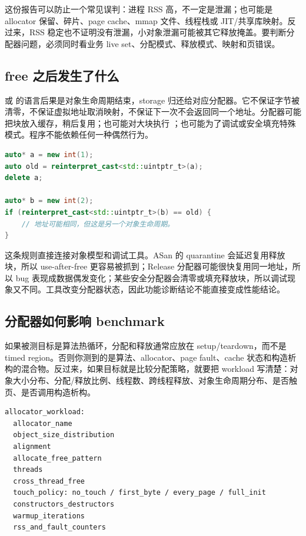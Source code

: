 这份报告可以防止一个常见误判：进程 RSS 高，不一定是泄漏；也可能是 allocator 保留、碎片、page cache、mmap 文件、线程栈或 JIT/共享库映射。反过来，RSS 稳定也不证明没有泄漏，小对象泄漏可能被其它释放掩盖。要判断分配器问题，必须同时看业务 live set、分配模式、释放模式、映射和页错误。

\subsection{free 之后发生了什么}

 或  的语言后果是对象生命周期结束，storage 归还给对应分配器。它不保证字节被清零，不保证虚拟地址取消映射，不保证下一次不会返回同一个地址。分配器可能把块放入缓存，稍后复用；也可能对大块执行 ；也可能为了调试或安全填充特殊模式。程序不能依赖任何一种偶然行为。

\begin{lstlisting}[language=C++,caption={地址复用不是对象复活}]
auto* a = new int(1);
auto old = reinterpret_cast<std::uintptr_t>(a);
delete a;

auto* b = new int(2);
if (reinterpret_cast<std::uintptr_t>(b) == old) {
    // 地址可能相同，但这是另一个对象生命周期。
}
\end{lstlisting}

这条规则直接连接对象模型和调试工具。ASan 的 quarantine 会延迟复用释放块，所以 use-after-free 更容易被抓到；Release 分配器可能很快复用同一地址，所以 bug 表现成数据偶发变化；某些安全分配器会清零或填充释放块，所以调试现象又不同。工具改变分配器状态，因此功能诊断结论不能直接变成性能结论。

\subsection{分配器如何影响 benchmark}

如果被测目标是算法热循环，分配和释放通常应放在 setup/teardown，而不是 timed region。否则你测到的是算法、allocator、page fault、cache 状态和构造析构的混合物。反过来，如果目标就是比较分配策略，就要把 workload 写清楚：对象大小分布、分配/释放比例、线程数、跨线程释放、对象生命周期分布、是否触页、是否调用构造析构。

\begin{lstlisting}[numbers=none,caption={allocator benchmark 必须说明的字段}]
allocator_workload:
  allocator_name
  object_size_distribution
  alignment
  allocate_free_pattern
  threads
  cross_thread_free
  touch_policy: no_touch / first_byte / every_page / full_init
  constructors_destructors
  warmup_iterations
  rss_and_fault_counters
\end{lstlisting}

